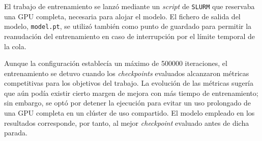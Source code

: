 \documentclass[11pt,spanish,listoffigures,listoftables]{tfgetsinf}
\begin{document}
El trabajo de entrenamiento se lanzó mediante un \textit{script} de \texttt{SLURM} que
reservaba una GPU completa, necesaria para alojar el modelo. El fichero de salida del modelo, \texttt{model.pt}, se utilizó
también como punto de guardado para permitir la reanudación del entrenamiento
en caso de interrupción por el límite temporal de la cola.

Aunque la configuración establecía un máximo de 500000 iteraciones, el
entrenamiento se detuvo cuando los \textit{checkpoints} evaluados alcanzaron
métricas competitivas para los objetivos del trabajo. La evolución de las
métricas sugería que aún podía existir cierto margen de mejora con más tiempo
de entrenamiento; sin embargo, se optó por detener la ejecución para evitar un
uso prolongado de una GPU completa en un clúster de uso compartido. El modelo empleado en los resultados corresponde, por tanto, al
mejor \textit{checkpoint} evaluado antes de dicha parada.


\clearpage
{}
{}
\label{anx:ods}




\end{document}

